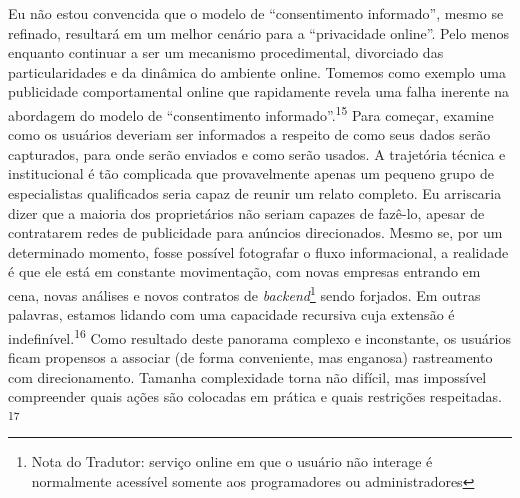 Eu não estou convencida que o modelo de ``consentimento informado'',
mesmo se refinado, resultará em um melhor cenário para a ``privacidade
online''. Pelo menos enquanto continuar a ser um mecanismo
procedimental, divorciado das particularidades e da dinâmica do ambiente
online. Tomemos como exemplo uma publicidade comportamental online que
rapidamente revela uma falha inerente na abordagem do modelo de
``consentimento informado''.\textsuperscript{{15}} Para começar, examine
como os usuários deveriam ser informados a respeito de como seus dados
serão capturados, para onde serão enviados e como serão usados. A
trajetória técnica e institucional é tão complicada que provavelmente
apenas um pequeno grupo de especialistas qualificados seria capaz de
reunir um relato completo. Eu arriscaria dizer que a maioria dos
proprietários não seriam capazes de fazê-lo, apesar de contratarem redes
de publicidade para anúncios direcionados. Mesmo se, por um determinado
momento, fosse possível fotografar o fluxo informacional, a realidade é
que ele está em constante movimentação, com novas empresas entrando em
cena, novas análises e novos contratos de \emph{backend}\footnote{Nota
  do Tradutor: serviço online em que o usuário não interage é
  normalmente acessível somente aos programadores ou administradores}
sendo forjados. Em outras palavras, estamos lidando com uma capacidade
recursiva cuja extensão é indefinível.\textsuperscript{{16}} Como
resultado deste panorama complexo e inconstante, os usuários ficam
propensos a associar (de forma conveniente, mas enganosa) rastreamento
com direcionamento. Tamanha complexidade torna não difícil, mas
impossível compreender quais ações são colocadas em prática e quais
restrições respeitadas. \textsuperscript{{17}}

